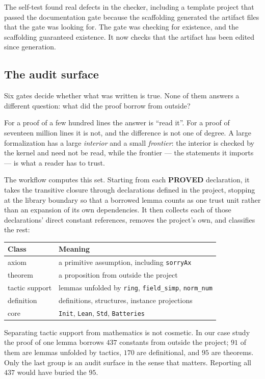 \documentclass[11pt]{article}
\newcommand{\claim}[1]{\textbf{#1}}
\newcommand{\code}[1]{\texttt{#1}}
\begin{document}
The self-test found real defects in the checker, including a template project
that passed the documentation gate because the scaffolding generated the
artifact files that the gate was looking for. The gate was checking for
existence, and the scaffolding guaranteed existence. It now checks that the
artifact has been edited since generation.

\subsection{The audit surface}
\label{sec:frontier}

Six gates decide whether what was written is true. None of them answers a
different question: what did the proof borrow from outside?

For a proof of a few hundred lines the answer is ``read it''. For a proof of
seventeen million lines it is not, and the difference is not one of degree. A
large formalization has a large \emph{interior} and a small \emph{frontier}:
the interior is checked by the kernel and need not be read, while the frontier
--- the statements it imports --- is what a reader has to trust.

The workflow computes this set. Starting from each \claim{PROVED}
declaration, it takes the transitive closure through declarations defined in
the project, stopping at the library boundary so that a borrowed lemma counts
as one trust unit rather than an expansion of its own dependencies. It then
collects each of those declarations' direct constant references, removes the
project's own, and classifies the rest:

\begin{center}
\begin{tabular}{@{}ll@{}}
\toprule
Class & Meaning \\
\midrule
axiom & a primitive assumption, including \code{sorryAx} \\
theorem & a proposition from outside the project \\
tactic support & lemmas unfolded by \code{ring}, \code{field\_simp},
  \code{norm\_num} \\
definition & definitions, structures, instance projections \\
core & \code{Init}, \code{Lean}, \code{Std}, \code{Batteries} \\
\bottomrule
\end{tabular}
\end{center}

Separating tactic support from mathematics is not cosmetic. In our case study
the proof of one lemma borrows $437$ constants from outside the project;
$91$ of them are lemmas unfolded by tactics, $170$ are definitional, and $95$
are theorems. Only the last group is an audit surface in the sense that
matters. Reporting all $437$ would have buried the $95$.
\end{document}
